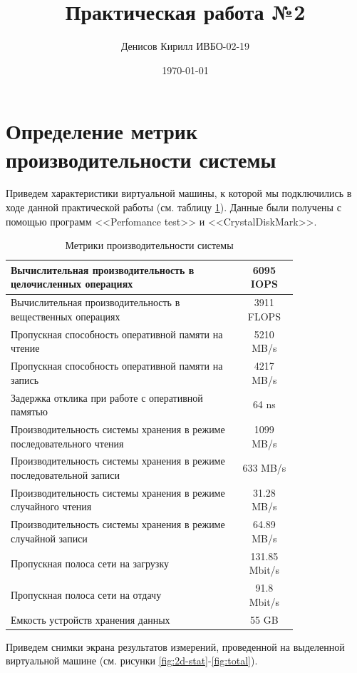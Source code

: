 \documentclass[a4paper,14pt]{extarticle}
\author{Денисов Кирилл ИВБО-02-19}
\title{Практическая работа №2}
\date{\today}
\begin{document}
\maketitle
\section{Определение метрик производительности системы}

Приведем характеристики виртуальной машины, к которой мы подключились в ходе данной практической работы (см. таблицу \ref{tab:metrics}). Данные были получены с помощью программ <<Perfomance test>> и <<CrystalDiskMark>>.

\begin{table}[htbp]
	\small
	\caption{Метрики производительности системы}
	\begin{tabular}{|p{0.8\linewidth}|c|}
		\hline
		Вычислительная производительность в целочисленных операциях & {6095 IOPS} \\ \hline
		Вычислительная производительность в вещественных операциях & {3911 FLOPS} \\ \hline
		Пропускная способность оперативной памяти на чтение & {5210 MB/s} \\ \hline
		Пропускная способность оперативной памяти на запись & {4217 MB/s} \\ \hline
		Задержка отклика при работе с оперативной памятью & {64 ns} \\ \hline
		Производительность системы хранения в режиме последовательного чтения &  1099 MB/s \\ \hline
		Производительность системы хранения в режиме последовательной записи &  633 MB/s \\ \hline
		Производительность системы хранения в режиме случайного чтения & 31.28 MB/s \\ \hline
		Производительность системы хранения в режиме случайной записи & 64.89 MB/s \\ \hline
		Пропускная полоса сети на загрузку & 131.85 Mbit/s \\ \hline
		Пропускная полоса сети на отдачу & 91.8 Mbit/s \\ \hline
		Емкость устройств хранения данных & 55 GB \\ \hline
	\end{tabular}
	\label{tab:metrics}
\end{table}
\normalsize
Приведем снимки экрана результатов измерений, проведенной на выделенной виртуальной машине (см. рисунки \ref{fig:2d-stat}-\ref{fig:total}).
\end{document}

